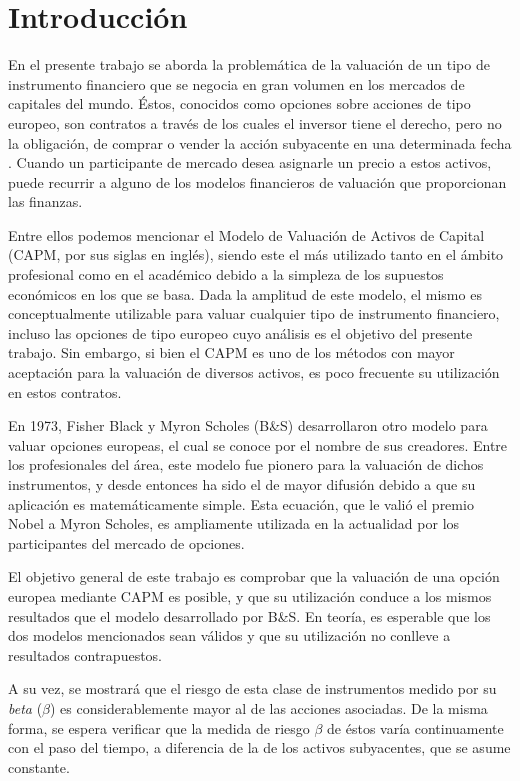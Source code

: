 

\chapter*{Introducción}\label{introduccion}

En el presente trabajo se aborda la problemática de la valuación de un tipo de instrumento financiero que se negocia en gran volumen en los mercados de capitales del mundo. Éstos, conocidos como opciones sobre acciones de tipo europeo, son contratos a través de los cuales el inversor tiene el derecho, pero no la obligación, de comprar o vender la acción subyacente en una determinada fecha \cite{hull}. Cuando un participante de mercado desea asignarle un precio a estos activos, puede recurrir a alguno de los modelos financieros de valuación que proporcionan las finanzas.

Entre ellos podemos mencionar el Modelo de Valuación de Activos de Capital (CAPM, por sus siglas en inglés), siendo este el más utilizado tanto en el ámbito profesional como en el académico debido a la simpleza de los supuestos económicos en los que se basa. Dada la amplitud de este modelo, el mismo es conceptualmente utilizable para valuar cualquier tipo de instrumento financiero, incluso las opciones de tipo europeo cuyo análisis es el objetivo del presente trabajo. Sin embargo, si bien el CAPM es uno de los métodos con mayor aceptación para la valuación de diversos activos, es poco frecuente su utilización en estos contratos.

En 1973, Fisher Black y Myron Scholes (B\&S) desarrollaron otro modelo para valuar opciones europeas, el cual se conoce por el nombre de sus creadores. Entre los profesionales del área, este modelo fue pionero para la valuación de dichos instrumentos, y desde entonces ha sido el de mayor difusión debido a que su aplicación es matemáticamente simple. Esta ecuación, que le valió el premio Nobel a Myron Scholes, es ampliamente utilizada en la actualidad por los participantes del mercado de opciones.

El objetivo general de este trabajo es comprobar que la valuación de una opción europea mediante CAPM es posible, y que su utilización conduce a los mismos resultados que el modelo desarrollado por B\&S. En teoría, es esperable que los dos modelos mencionados sean válidos y que su utilización no conlleve a resultados contrapuestos.

A su vez, se mostrará que el riesgo de esta clase de instrumentos medido por su \textit{beta} ($\beta$) es considerablemente mayor al de las acciones asociadas. De la misma forma, se espera verificar que la medida de riesgo $ \beta $ de éstos varía continuamente con el paso del tiempo, a diferencia de la de los activos subyacentes, que se asume constante.

